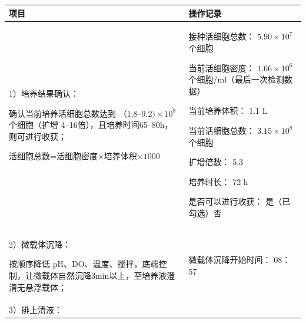 \documentclass[UTF8,10pt,a4paper,fontset=fandol]{ctexart}
\newcommand{\fieldvalue}[1]{#1}
\newcommand{\handwritten}[1]{#1}
\begin{document}
\begin{tabularx}{\textwidth}{|p{}|X|}
\hline
\centering 项目 & \centering\arraybackslash 操作记录 \\
\hline
\begin{minipage}[t]{0.49\textwidth}
1）培养结果确认：

确认当前培养活细胞总数达到
（$1.8$--$9.2)\times10^{8}$个细胞（扩增
4--16倍），且培养时间65--80h，则可进行收获；

活细胞总数=活细胞密度$\times$培养体积$\times1000$
\end{minipage}
&
\begin{minipage}[t]{0.40\textwidth}
接种活细胞总数：
\fieldvalue{\handwritten{$5.90\times10^{7}$}}个细胞

当前活细胞密度：
\fieldvalue{\handwritten{$1.66\times10^{6}$}}个细胞/ml（最后一次检测数据）

当前培养体积：
\fieldvalue{\handwritten{1.1}} L

当前活细胞总数：
\fieldvalue{\handwritten{$3.15\times10^{8}$}}个细胞

扩增倍数：
\fieldvalue{\handwritten{5.3}}

培养时长：
\fieldvalue{\handwritten{72}} h

是否可以进行收获：
\fieldvalue{\handwritten{是（已勾选）}}\quad 否
\end{minipage}
\\
\hline
\begin{minipage}[t]{0.49\textwidth}
2）微载体沉降：

按顺序降低 pH、DO、温度、搅拌，底端控制，让微载体自然沉降3min以上，至培养液澄清无悬浮载体；
\end{minipage}
&
\begin{minipage}[t]{0.40\textwidth}
微载体沉降开始时间：
\fieldvalue{\handwritten{08：57}}
\end{minipage}
\\
\hline
\begin{minipage}[t]{0.49\textwidth}
3）排上清液：


\end{minipage}
\end{tabularx}
\end{document}
